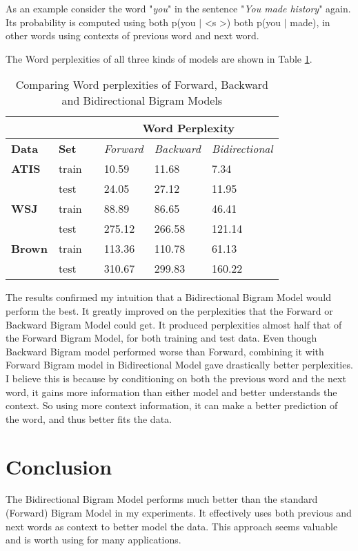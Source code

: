 \documentclass{article}
\begin{document}
As an example consider the word "\textit{you}" in the sentence "\textit{You made history}" again. Its probability is computed using both p(you $|$ \textless s \textgreater) both p(you $|$ made), in other words using contexts of previous word and next word.



The Word perplexities of all three kinds of models are shown in Table \ref{all}.
\begin{table}[h]
\centering
\begin{tabular}{@{}llllll@{}}
\toprule
\textbf{}      & \textbf{}    &  & \multicolumn{3}{c}{\textbf{Word Perplexity}}                  \\ \midrule
\textbf{Data}  & \textbf{Set} &  & \textit{Forward} & \textit{Backward} & \textit{Bidirectional} \\ \midrule
\textbf{ATIS}  & train        &  & 10.59           & 11.68             & 7.34                  \\ \midrule
               & test         &  & 24.05           & 27.12            & 11.95                 \\ \midrule
\textbf{WSJ}   & train        &  & 88.89           & 86.65            & 46.41                 \\ \midrule
               & test         &  & 275.12           & 266.58           & 121.14                \\ \midrule
\textbf{Brown} & train        &  & 113.36          & 110.78            & 61.13                  \\ \midrule
               & test         &  & 310.67          & 299.83           & 160.22               \\ \bottomrule
\end{tabular}
\caption{Comparing Word perplexities of Forward, Backward and Bidirectional Bigram Models}
\label{all}
\end{table}

The results confirmed my intuition that a Bidirectional Bigram Model would perform the best. It greatly improved on the perplexities that the Forward or Backward Bigram Model could get. It produced perplexities almost half that of the Forward Bigram Model, for both training and test data. Even though Backward Bigram model performed worse than Forward, combining it with Forward Bigram model in Bidirectional Model gave drastically better perplexities. I believe this is because by conditioning on both the previous word and the next word, it gains more information than either model and better understands the context. So using more context information, it can make a better prediction of the word, and thus better fits the data. 
\section{Conclusion}
The Bidirectional Bigram Model performs much better than the standard (Forward) Bigram Model in my experiments. It effectively uses both previous and next words as context to better model the data. This approach seems valuable and is worth using for many applications.
\end{document}
